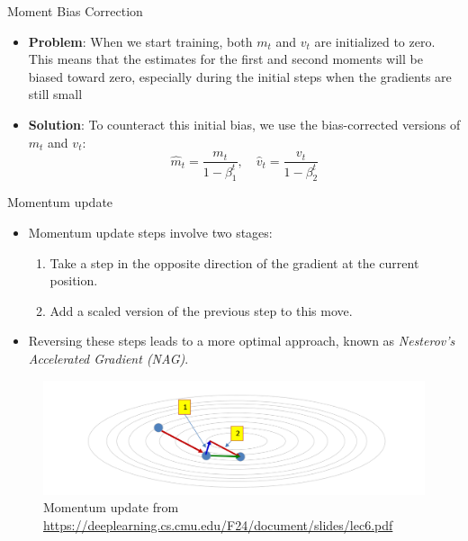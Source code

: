 \documentclass[serif, aspectratio=169]{beamer}
\begin{document}
\begin{frame}{Moment Bias Correction}
    \begin{itemize}
        \item \textbf{Problem}: When we start training, both $m_t$ and $v_t$ are initialized to zero. This means that the estimates for the first and second moments will be biased toward zero, especially during the initial steps when the gradients are still small
        \item \textbf{Solution}: To counteract this initial bias, we use the bias-corrected versions of $m_t$ and $v_t$:
        \[\hat{m}_t = \frac{m_t}{1 - \beta_1^t}, \quad 
        \hat{v}_t = \frac{v_t}{1 -\beta_2^t}\]
    \end{itemize}
\end{frame}

\begin{frame}{Momentum update}
    \begin{minipage}{0.5\textwidth}
    \begin{itemize}
    \item Momentum update steps involve two stages:
    \begin{enumerate}
        \item Take a step in the opposite direction of the gradient at the current position.
        \item Add a scaled version of the previous step to this move.
    \end{enumerate}
    \item Reversing these steps leads to a more optimal approach, known as \textit{Nesterov's Accelerated Gradient (NAG)}.
    \end{itemize}
\end{minipage}%
\begin{minipage}{0.5\textwidth}
    \begin{figure}[h]
        \centering
        \includegraphics[height=.3\textheight]{pic/momentum_update.png}
        \caption{Momentum update from \url{https://deeplearning.cs.cmu.edu/F24/document/slides/lec6.pdf}}
    \end{figure}
\end{minipage}
\end{frame}
\end{document}

